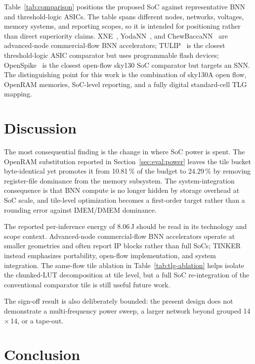 \documentclass[conference]{IEEEtran}
\begin{document}
Table~\ref{tab:comparison} positions the proposed SoC against
representative BNN and threshold-logic ASICs. The table spans
different nodes, networks, voltages, memory systems, and reporting
scopes, so it is intended for positioning rather than direct
superiority claims. XNE~\cite{conti2018xnor}, YodaNN~\cite{andri2018yodann},
and ChewBaccaNN~\cite{andri2021chewbaccann} are advanced-node
commercial-flow BNN accelerators; TULIP~\cite{wagle2020tulip} is the closest
threshold-logic ASIC comparator but uses programmable flash devices;
OpenSpike~\cite{modaresi2023openspike} is the closest open-flow sky130 SoC
comparator but targets an SNN. The distinguishing point for this
work is the combination of sky130A open flow, OpenRAM memories,
SoC-level reporting, and a fully digital standard-cell TLG mapping.

\section{Discussion}
\label{sec:discussion}

The most consequential finding is the change in where SoC power is
spent. The OpenRAM substitution reported in
Section~\ref{sec:eval:power} leaves the tile bucket byte-identical
yet promotes it from 10.81\,\% of the budget to 24.29\,\% by removing
register-file dominance from the memory subsystem. The
system-integration consequence is that BNN compute is no longer
hidden by storage overhead at SoC scale, and tile-level optimization
becomes a first-order target rather than a rounding error against
IMEM/DMEM dominance.

The reported per-inference energy of 8.06\,\textmu J should be read
in its technology and scope context. Advanced-node commercial-flow
BNN accelerators operate at smaller geometries and often report IP
blocks rather than full SoCs; TINKER instead emphasizes portability,
open-flow implementation, and system integration. The same-flow tile
ablation in Table~\ref{tab:tlg-ablation} helps isolate the
chunked-LUT decomposition at tile level, but a full SoC re-integration
of the conventional comparator tile is still useful future work.

The sign-off result is also deliberately bounded: the present
design does not demonstrate a multi-frequency power sweep, a larger
network beyond grouped 14\,\(\times\)\,14, or a tape-out.

\section{Conclusion}
\label{sec:conclusion}
\end{document}
